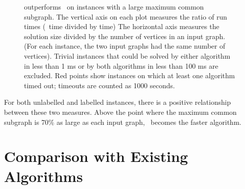 \begin{figure}[h!]
    \centering
    \caption{\McSplit{$\downarrow$} outperforms \McSplit\ on instances with a large maximum common subgraph.
        The vertical axis on each plot measures the ratio of run times (\McSplit\ time divided by \McSplit{$\downarrow$} time)
        The horizontal axis measures the solution size divided by the number of vertices
        in an input graph.  (For each instance, the two input graphs had
        the same number of vertices).  Trivial instances that could be solved by either algorithm in less
        than 1 ms or by both algorithms in less than 100 ms are excluded.  Red points show instances
        on which at least one algorithm timed out; timeouts are counted as 1000
        seconds.}\label{figure:mcsplit-runtime-ratio-soln-size}
\end{figure}

For both unlabelled and labelled instances, there is a positive
relationship between these two measures. Above the point where the maximum
common subgraph is 70\% as large as each input graph, \McSplitDown\ becomes
the faster algorithm.

\section{Comparison with Existing Algorithms}\label{sec:comparison}

